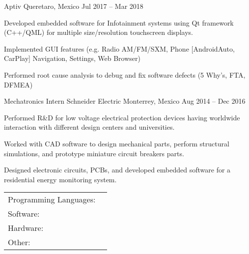 \documentclass[]{awesome-cv}
\begin{document}
\begin{cventries}
	{Aptiv}
	{Queretaro, Mexico}
	{Jul 2017 – Mar 2018}
	{\begin{cvitems}
		\item {Developed embedded software for Infotainment systems using Qt framework (C++/QML) for multiple size/resolution touchscreen displays.}
		\item {Implemented GUI features (e.g. Radio AM/FM/SXM, Phone [AndroidAuto, CarPlay] Navigation, Settings, Web Browser)}
		\item {Performed root cause analysis to debug and fix software defects (5 Why’s, FTA, DFMEA)}
		\end{cvitems}}
	\cventry
	{Mechatronics Intern}
	{Schneider Electric}
	{Monterrey, Mexico}
	{Aug 2014 – Dec 2016}
	{\begin{cvitems}
		\item {Performed R\&D for low voltage electrical protection devices having worldwide interaction with different design centers and universities.}
		\item {Worked with CAD software to design mechanical parts, perform structural simulations, and prototype miniature circuit breakers parts.}
		\item {Designed electronic circuits, PCBs, and developed embedded software for a residential energy monitoring system.}
		\end{cvitems}}
\end{cventries}

\vspace{-5mm}
\begin{cventries}
	\cventry
	{}
	{\def\arraystretch{1.15}{\begin{tabular}{ l l }
		Programming Languages:  & {\skill{\quad C/C++, Python, Java, Rust}} \\
		Software:  & {\skill{\quad Linux, QNX, Android, Git, Qt, OpenCV, ROS, MQTT, ZMQ, DDS, Protobuf}} \\
		Hardware:  & {\skill{\quad x86, ARM, RISC V, Raspberry Pi, Arduino, ESP32, NVIDIA Jetson}} \\
		Other:  & {\skill{\quad CAN, Ethernet, SPI, I2C, WiFi, BLE, UWB, LoRa, RF}} \\
		\end{tabular}}}
	{}
	{}
	{}
\end{cventries}

\vspace{-10mm}
\vspace{-2mm}
\end{document}

